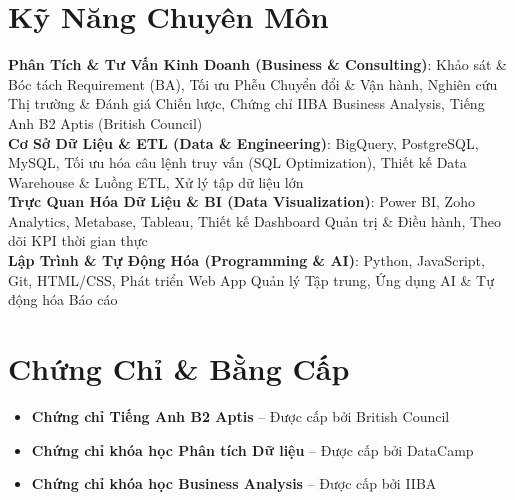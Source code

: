 \documentclass[letterpaper,11pt]{article}
\newcommand{\resumeItem}[1]{
  \item\small{
    {#1 \vspace{1pt}}
  }
}
\newcommand{\resumeItemListStart}{\begin{itemize}[leftmargin=0.15in, itemsep=2.5pt, topsep=2pt, parsep=1.5pt]}
\newcommand{\resumeItemListEnd}{\end{itemize}\vspace{2pt}}
\begin{document}
\section*{Kỹ Năng Chuyên Môn}
 \begin{itemize}[leftmargin=0.15in, label={}]
    \small{\item{
     \textbf{Phân Tích \& Tư Vấn Kinh Doanh (Business \& Consulting)}: {Khảo sát \& Bóc tách Requirement (BA), Tối ưu Phễu Chuyển đổi \& Vận hành, Nghiên cứu Thị trường \& Đánh giá Chiến lược, Chứng chỉ IIBA Business Analysis, Tiếng Anh B2 Aptis (British Council)} \\ \vspace{2pt}
     \textbf{Cơ Sở Dữ Liệu \& ETL (Data \& Engineering)}: {BigQuery, PostgreSQL, MySQL, Tối ưu hóa câu lệnh truy vấn (SQL Optimization), Thiết kế Data Warehouse \& Luồng ETL, Xử lý tập dữ liệu lớn} \\ \vspace{2pt}
     \textbf{Trực Quan Hóa Dữ Liệu \& BI (Data Visualization)}: {Power BI, Zoho Analytics, Metabase, Tableau, Thiết kế Dashboard Quản trị \& Điều hành, Theo dõi KPI thời gian thực} \\ \vspace{2pt}
     \textbf{Lập Trình \& Tự Động Hóa (Programming \& AI)}: {Python, JavaScript, Git, HTML/CSS, Phát triển Web App Quản lý Tập trung, Ứng dụng AI \& Tự động hóa Báo cáo}
    }}
 \end{itemize}

\section*{Chứng Chỉ \& Bằng Cấp}
        \resumeItemListStart
      \resumeItem{\textbf{Chứng chỉ Tiếng Anh B2 Aptis} -- Được cấp bởi British Council}
      \resumeItem{\textbf{Chứng chỉ khóa học Phân tích Dữ liệu} -- Được cấp bởi DataCamp}
      \resumeItem{\textbf{Chứng chỉ khóa học Business Analysis} -- Được cấp bởi IIBA}
      \resumeItemListEnd

\end{document}
